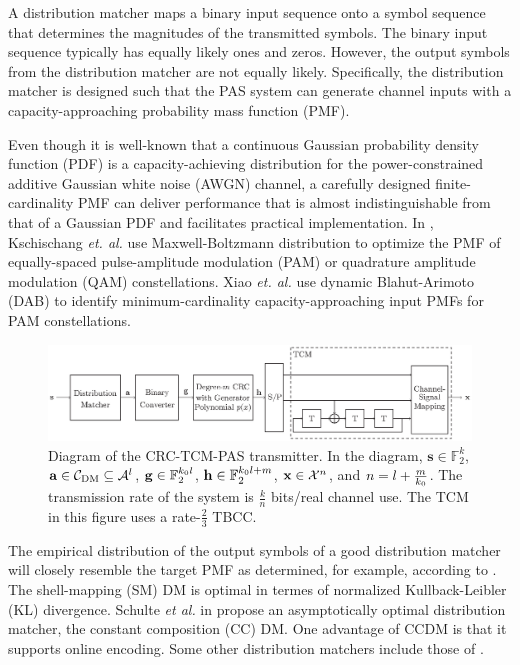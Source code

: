 \documentclass [PhD] {uclathes}
\begin{document}
A distribution matcher \cite{CCDM_schulte,SMDM_amjad,ccdm_smdm_comp_schulte,patrick,pikus2019arithmetic,fehenberger2018multiset} maps a binary  input sequence onto a symbol sequence that determines the magnitudes of the transmitted symbols. The  binary input sequence typically has equally likely ones and zeros. However, the output symbols from  the distribution matcher are not equally likely. Specifically, the distribution matcher is designed such that the PAS system can generate channel inputs with a capacity-approaching probability mass function (PMF). 

Even though it is well-known that 
a continuous Gaussian probability density function (PDF) is a
capacity-achieving distribution for the power-constrained additive Gaussian white noise (AWGN) channel, a carefully designed  finite-cardinality PMF  can deliver performance that is almost indistinguishable from that of a Gaussian PDF and facilitates practical implementation.  In \cite{Kschischangoptimaldist}, Kschischang \emph{et. al.} use Maxwell-Boltzmann distribution to optimize the PMF of equally-spaced pulse-amplitude modulation (PAM) or quadrature amplitude modulation (QAM) constellations. Xiao \emph{et. al.} use dynamic Blahut-Arimoto (DAB) to identify  minimum-cardinality capacity-approaching input PMFs for PAM constellations\cite{xiao2021finite}. 
\begin{figure}[t]
    \centering
    \includegraphics[width=1\linewidth]{figures/CRC_TCM_PAS_v2.eps }
    \caption{Diagram of the CRC-TCM-PAS transmitter. In the diagram, $\mathbf{s}\in\mathbb{F}_2^{k}$, $\mathbf{a}\in\mathcal{C}_{\mathrm{DM}}\subseteq\mathcal{A}^{l}$, $\mathbf{g}\in\mathbb{F}_2^{k_0 l}$,   $\mathbf{h}\in\mathbb{F}_2^{k_0 l+m}$, $\mathbf{x}\in\mathcal{X}^{n}$, and $n=l+\frac{m}{k_0}$. The transmission rate of the system is $\frac{k}{n}$ bits/real channel use. The TCM in this figure uses a rate-$\frac{2}{3}$ TBCC.}
    \label{fig: transmitter}
\end{figure}


The empirical distribution of the output symbols of a good distribution matcher will closely resemble the target PMF as determined, for example, according to \cite{xiao2021finite}. The shell-mapping (SM) DM  \cite{SMDM_amjad,ccdm_smdm_comp_schulte}  is optimal in termes of normalized Kullback-Leibler (KL) divergence.  Schulte \emph{et al.} in \cite{CCDM_schulte} propose an asymptotically optimal distribution matcher, the constant composition (CC) DM. 
One advantage of CCDM is that it supports online encoding. 
Some other distribution matchers include those of  \cite{patrick,pikus2019arithmetic,fehenberger2018multiset}.
\end{document}

